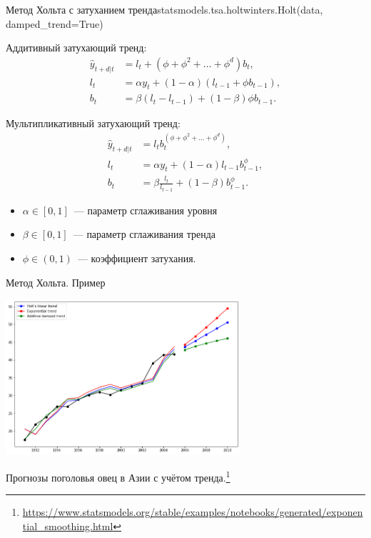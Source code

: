 \documentclass[10pt,pdf,utf8,hyperref={unicode},aspectratio=169]{beamer}
\begin{document}
\begin{frame}{Метод Хольта с затуханием тренда}{statsmodels.tsa.holtwinters.Holt(data, damped\_trend=True)}
	
	\begin{multicols}{2}
		
		Аддитивный затухающий тренд:
		\begin{align*}
		\hat{y}_{t+d|t} &= l_t + \left(\phi + \phi^2 + \dots + \phi^{d}\right) b_t, \\
		l_{t}       &= \alpha y_t + \left(1-\alpha\right) \left(l_{t-1} +\phi b_{t-1}\right), \\
		b_t         &= \beta \left(l_t - l_{t-1}\right) + \left(1-\beta\right)\phi b_{t-1}.
		\end{align*}
		
		\columnbreak
		
		Мультипликативный затухающий тренд:
		\begin{align*}
		\hat{y}_{t+d|t} &= l_t b_t^{\left(\phi + \phi^2 + \dots + \phi^{d}\right)}, \\
		l_{t}       &= \alpha y_t + \left(1-\alpha\right) l_{t-1} b_{t-1}^{\phi}, \\
		b_t         &= \beta\frac{l_t}{l_{t-1}} + \left(1-\beta\right)b_{t-1}^{\phi}.
		\end{align*}
	\end{multicols}
		
		\bigskip
		\begin{itemize}
			\item $\alpha \in \left[0,1\right]$~--- параметр сглаживания уровня
			\item $\beta \in \left[0,1\right]$~--- параметр сглаживания тренда
			\item $\phi \in \left(0,1\right)$~--- коэффициент затухания.
		\end{itemize}
		
\end{frame}

\begin{frame}{Метод Хольта. Пример}
		\begin{center}
			\includegraphics[width=0.65\textwidth]{fig_7_from_statsmodels.png}
		\end{center}
		Прогнозы поголовья овец в Азии с учётом тренда.\footnote{\url{https://www.statsmodels.org/stable/examples/notebooks/generated/exponential_smoothing.html}}
\end{frame}
\end{document}
